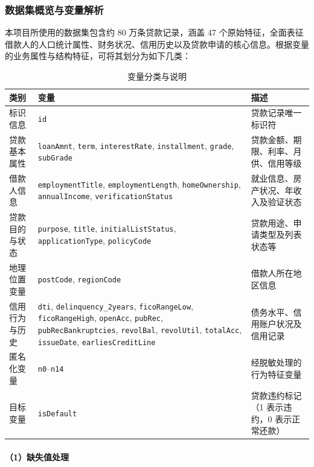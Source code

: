 \documentclass{thuemp}
\begin{document}
\subsubsection{数据集概览与变量解析}

本项目所使用的数据集包含约 80 万条贷款记录，涵盖 47 个原始特征，全面表征借款人的人口统计属性、财务状况、信用历史以及贷款申请的核心信息。根据变量的业务属性与结构特征，可将其划分为如下几类：

\begin{table}[H]
\centering
\caption{变量分类与说明}
\begin{tabularx}{\textwidth}{|l|p{4cm}|>{\raggedright\arraybackslash}X|}
\hline
类别 & 变量 & 描述 \\ \hline
标识信息 & \texttt{id} & 贷款记录唯一标识符 \\ \hline
贷款基本属性 & \texttt{loanAmnt}, \texttt{term}, \texttt{interestRate}, \texttt{installment}, \texttt{grade}, \texttt{subGrade} & 贷款金额、期限、利率、月供、信用等级 \\ \hline
借款人信息 & \texttt{employmentTitle}, \texttt{employmentLength}, \texttt{homeOwnership}, \texttt{annualIncome}, \texttt{verificationStatus} & 就业信息、房产状况、年收入及验证状态 \\ \hline
贷款目的与状态 & \texttt{purpose}, \texttt{title}, \texttt{initialListStatus}, \texttt{applicationType}, \texttt{policyCode} & 贷款用途、申请类型及列表状态等 \\ \hline
地理位置变量 & \texttt{postCode}, \texttt{regionCode} & 借款人所在地区信息 \\ \hline
信用行为与历史 & \texttt{dti}, \texttt{delinquency\_2years}, \texttt{ficoRangeLow}, \texttt{ficoRangeHigh}, \texttt{openAcc}, \texttt{pubRec}, \texttt{pubRecBankruptcies}, \texttt{revolBal}, \texttt{revolUtil}, \texttt{totalAcc}, \texttt{issueDate}, \texttt{earliesCreditLine} & 债务水平、信用账户状况及信用记录 \\ \hline
匿名化变量 & \texttt{n0}--\texttt{n14} & 经脱敏处理的行为特征变量 \\ \hline
目标变量 & \texttt{isDefault} & 贷款违约标记（1 表示违约，0 表示正常还款） \\ \hline
\end{tabularx}
\end{table}

\paragraph{（1）缺失值处理}
\end{document}
